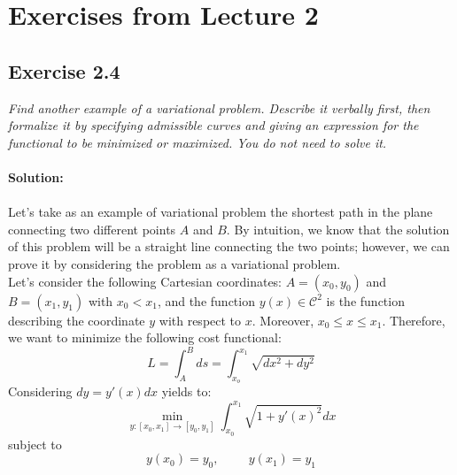 \section{Exercises from Lecture 2}

\subsection{Exercise 2.4}
\emph{Find another example of a variational problem. Describe it verbally first, then formalize it by specifying admissible curves and giving an expression for the functional to be minimized or maximized. You do not need to solve it.}\\
\\
\textbf{Solution:}\\
\\
Let's take as an example of variational problem the shortest path in the plane connecting two different points $A$ and $B$. By intuition, we know that the solution of this problem will be a straight line connecting the two points; however, we can prove it by considering the problem as a variational problem.\\
Let's consider the following Cartesian coordinates: $A = (x_0, y_0)$ and $B = (x_1, y_1)$ with $x_0 < x_1$, and the function $y(x) \in \mathcal{C}^2$ is the function describing the coordinate $y$ with respect to $x$. Moreover, $x_0 \leq x\leq x_1$. Therefore, we want to minimize the following cost functional:
\begin{equation}
    L  = \int_A^B ds =  \int_{x_o}^{x_1} \sqrt{dx^2 + dy^2} 
\end{equation}
Considering $dy = y'(x)dx$ yields to:
\begin{equation}
    \min\limits_{y:[x_0, x_1] \to [y_0, y_1]} \int_{x_0}^{x_1} \sqrt{1 + y'(x)^2} dx
\end{equation}
subject to
\begin{equation}
    y(x_0) = y_0, \hspace{1cm} y(x_1) = y_1
\end{equation}
\QEDB

